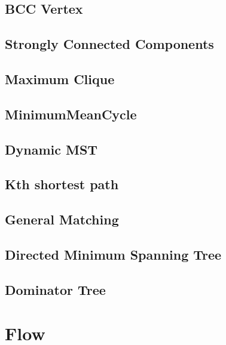 \documentclass[a4paper,10pt,twocolumn,oneside]{article}
\begin{document}
\subsection{BCC Vertex}


\subsection{Strongly Connected Components}


\subsection{Maximum Clique}


\subsection{MinimumMeanCycle}


\subsection{Dynamic MST}


\subsection{Kth shortest path}


\subsection{General Matching}


\subsection{Directed Minimum Spanning Tree}


\subsection{Dominator Tree}



\section{Flow}
%
\end{document}

